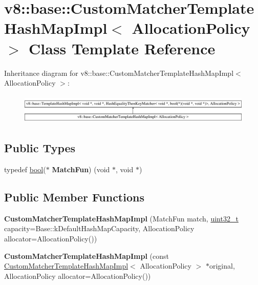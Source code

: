 \hypertarget{classv8_1_1base_1_1CustomMatcherTemplateHashMapImpl}{}\section{v8\+:\+:base\+:\+:Custom\+Matcher\+Template\+Hash\+Map\+Impl$<$ Allocation\+Policy $>$ Class Template Reference}
\label{classv8_1_1base_1_1CustomMatcherTemplateHashMapImpl}
Inheritance diagram for v8\+:\+:base\+:\+:Custom\+Matcher\+Template\+Hash\+Map\+Impl$<$ Allocation\+Policy $>$\+:\begin{figure}[H]
\begin{center}
\leavevmode
\includegraphics[height=1.445161cm]{classv8_1_1base_1_1CustomMatcherTemplateHashMapImpl}
\end{center}
\end{figure}
\subsection*{Public Types}
\begin{DoxyCompactItemize}
\item 
\mbox{\label{classv8_1_1base_1_1CustomMatcherTemplateHashMapImpl_ab86176cf9773a777df6d4627da5060c1}} 
typedef \mbox{\hyperlink{classbool}{bool}}($\ast$ {\bfseries Match\+Fun}) (void $\ast$, void $\ast$)
\end{DoxyCompactItemize}
\subsection*{Public Member Functions}
\begin{DoxyCompactItemize}
\item 
\mbox{\label{classv8_1_1base_1_1CustomMatcherTemplateHashMapImpl_a8a3f0d772934d346d82b2d683c8cc235}} 
{\bfseries Custom\+Matcher\+Template\+Hash\+Map\+Impl} (Match\+Fun match, \mbox{\hyperlink{classuint32__t}{uint32\+\_\+t}} capacity=Base\+::k\+Default\+Hash\+Map\+Capacity, Allocation\+Policy allocator=Allocation\+Policy())
\item 
\mbox{\label{classv8_1_1base_1_1CustomMatcherTemplateHashMapImpl_a05165c8f7cc60079c26e723d4a877ca3}} 
{\bfseries Custom\+Matcher\+Template\+Hash\+Map\+Impl} (const \mbox{\hyperlink{classv8_1_1base_1_1CustomMatcherTemplateHashMapImpl}{Custom\+Matcher\+Template\+Hash\+Map\+Impl}}$<$ Allocation\+Policy $>$ $\ast$original, Allocation\+Policy allocator=Allocation\+Policy())
\end{DoxyCompactItemize}
